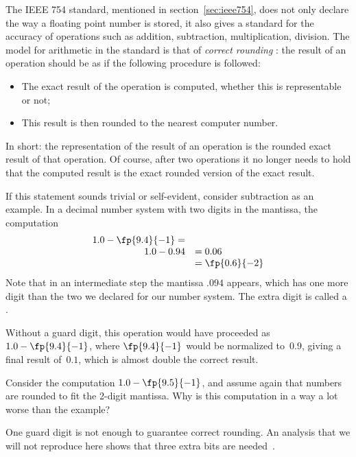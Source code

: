 The IEEE 754 standard, mentioned in section~\ref{sec:ieee754}, does
not only declare the way a floating point number is stored, it also
gives a standard for the accuracy of operations such as addition,
subtraction, multiplication, division. The model for arithmetic in the
standard is that of \emph{correct rounding}%
%
%
:
the result of an
operation should be as if the following procedure is followed:
\begin{itemize}
\item The exact result of the operation is computed, whether this is
  representable or not;
\item This result is then rounded to the nearest computer number.
\end{itemize}
In short: the representation of the result of an
operation is the rounded exact result of that operation.
Of course,
after two operations it no longer needs to hold that the computed
result is the exact rounded version of the exact result.

If this statement sounds trivial or self-evident, consider subtraction
as an example. In a decimal number system with two digits in the
mantissa, the computation
\begin{equation}
\begin{array}{rl}
  1.0-\fp{9.4}{-1}=\\ 1.0-0.94&=0.06\\&=\fp{0.6}{-2}\\
\end{array}
\end{equation}
Note that in an
intermediate step the mantissa $.094$ appears, which has one more
digit than the two we declared for our number system. The extra digit
is called a .

Without a guard digit, this operation would have proceeded as
$1.0-\fp{9.4}{-1}$, where $\fp{9.4}{-1}$ would be normalized to~$0.9$,
giving a final result of~$0.1$, which is almost double the correct result.
\begin{exercise}
  Consider the computation $1.0-\fp{9.5}{-1}$, and assume again that
  numbers are rounded to fit the 2-digit mantissa. Why is this
  computation in a way a lot worse than the example?
\end{exercise}
One guard digit is not enough to guarantee correct rounding. An
analysis that we will not reproduce here shows that three extra bits
are needed~\cite{Goldberg:arithmetic}.

